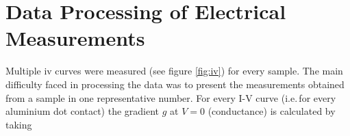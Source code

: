 \section{Data Processing of Electrical Measurements}
\label{sec:eval}
Multiple \gls{iv} curves were measured (see figure \ref{fig:iv}) for every sample.
The main difficulty faced in processing the data was to present the measurements obtained 
from a sample in one representative number. 
%
%
For every I-V curve (i.e.\,for every aluminium dot contact) the gradient $g$ at $V=0$ (conductance) is calculated by taking 
